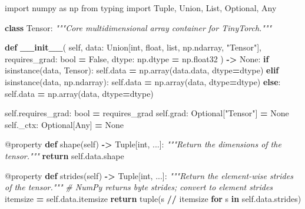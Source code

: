 \documentclass[
  letterpaper,
]{scrbook}
\newenvironment{Shaded}{\begin{snugshade}}{\end{snugshade}}
\newcommand{\AttributeTok}[1]{\textcolor[rgb]{0.13,0.29,0.53}{#1}}
\newcommand{\BuiltInTok}[1]{#1}
\newcommand{\CommentTok}[1]{\textcolor[rgb]{0.56,0.35,0.01}{\textit{#1}}}
\newcommand{\ControlFlowTok}[1]{\textcolor[rgb]{0.13,0.29,0.53}{\textbf{#1}}}
\newcommand{\FunctionTok}[1]{\textcolor[rgb]{0.13,0.29,0.53}{\textbf{#1}}}
\newcommand{\ImportTok}[1]{#1}
\newcommand{\KeywordTok}[1]{\textcolor[rgb]{0.13,0.29,0.53}{\textbf{#1}}}
\newcommand{\NormalTok}[1]{#1}
\newcommand{\OperatorTok}[1]{\textcolor[rgb]{0.81,0.36,0.00}{\textbf{#1}}}
\newcommand{\StringTok}[1]{\textcolor[rgb]{0.31,0.60,0.02}{#1}}
\newcommand{\VariableTok}[1]{\textcolor[rgb]{0.00,0.00,0.00}{#1}}
\begin{document}
\begin{Shaded}
\begin{Highlighting}[]
\ImportTok{import}\NormalTok{ numpy }\ImportTok{as}\NormalTok{ np}
\ImportTok{from}\NormalTok{ typing }\ImportTok{import}\NormalTok{ Tuple, Union, List, Optional, Any}

\KeywordTok{class}\NormalTok{ Tensor:}
    \CommentTok{"""Core multidimensional array container for TinyTorch."""}

    \KeywordTok{def} \FunctionTok{\_\_init\_\_}\NormalTok{(}
        \VariableTok{self}\NormalTok{,}
\NormalTok{        data: Union[}\BuiltInTok{int}\NormalTok{, }\BuiltInTok{float}\NormalTok{, }\BuiltInTok{list}\NormalTok{, np.ndarray, }\StringTok{"Tensor"}\NormalTok{],}
\NormalTok{        requires\_grad: }\BuiltInTok{bool} \OperatorTok{=} \VariableTok{False}\NormalTok{,}
\NormalTok{        dtype: np.dtype }\OperatorTok{=}\NormalTok{ np.float32}
\NormalTok{    ) }\OperatorTok{{-}\textgreater{}} \VariableTok{None}\NormalTok{:}
        \ControlFlowTok{if} \BuiltInTok{isinstance}\NormalTok{(data, Tensor):}
            \VariableTok{self}\NormalTok{.data }\OperatorTok{=}\NormalTok{ np.array(data.data, dtype}\OperatorTok{=}\NormalTok{dtype)}
        \ControlFlowTok{elif} \BuiltInTok{isinstance}\NormalTok{(data, np.ndarray):}
            \VariableTok{self}\NormalTok{.data }\OperatorTok{=}\NormalTok{ np.array(data, dtype}\OperatorTok{=}\NormalTok{dtype)}
        \ControlFlowTok{else}\NormalTok{:}
            \VariableTok{self}\NormalTok{.data }\OperatorTok{=}\NormalTok{ np.array(data, dtype}\OperatorTok{=}\NormalTok{dtype)}

        \VariableTok{self}\NormalTok{.requires\_grad: }\BuiltInTok{bool} \OperatorTok{=}\NormalTok{ requires\_grad}
        \VariableTok{self}\NormalTok{.grad: Optional[}\StringTok{"Tensor"}\NormalTok{] }\OperatorTok{=} \VariableTok{None}
        \VariableTok{self}\NormalTok{.\_ctx: Optional[Any] }\OperatorTok{=} \VariableTok{None}

    \AttributeTok{@property}
    \KeywordTok{def}\NormalTok{ shape(}\VariableTok{self}\NormalTok{) }\OperatorTok{{-}\textgreater{}}\NormalTok{ Tuple[}\BuiltInTok{int}\NormalTok{, ...]:}
        \CommentTok{"""Return the dimensions of the tensor."""}
        \ControlFlowTok{return} \VariableTok{self}\NormalTok{.data.shape}

    \AttributeTok{@property}
    \KeywordTok{def}\NormalTok{ strides(}\VariableTok{self}\NormalTok{) }\OperatorTok{{-}\textgreater{}}\NormalTok{ Tuple[}\BuiltInTok{int}\NormalTok{, ...]:}
        \CommentTok{"""Return the element{-}wise strides of the tensor."""}
        \CommentTok{\# NumPy returns byte strides; convert to element strides}
\NormalTok{        itemsize }\OperatorTok{=} \VariableTok{self}\NormalTok{.data.itemsize}
        \ControlFlowTok{return} \BuiltInTok{tuple}\NormalTok{(s }\OperatorTok{//}\NormalTok{ itemsize }\ControlFlowTok{for}\NormalTok{ s }\KeywordTok{in} \VariableTok{self}\NormalTok{.data.strides)}


\end{Highlighting}
\end{Shaded}
\end{document}
